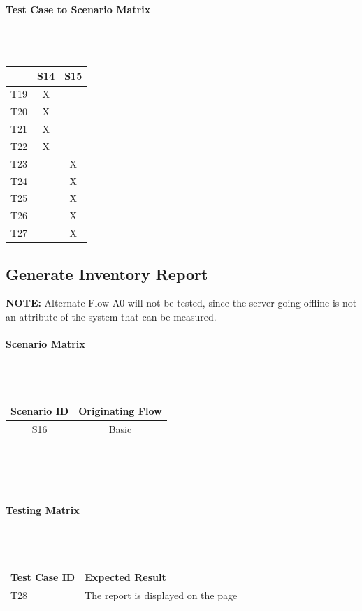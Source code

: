 \documentclass{article}
\begin{document}
\paragraph{Test Case to Scenario Matrix}~\\ \\
\begin{tabular}{ | c || c | c | }
\hline
    & S14 & S15 \\
\hline
\hline
T19 &  X  &     \\
\hline
T20 &  X  &     \\
\hline
T21 &  X  &     \\
\hline
T22 &  X  &     \\
\hline
T23 &     &  X  \\
\hline
T24 &     &  X  \\
\hline
T25 &     &  X  \\
\hline
T26 &     &  X  \\
\hline
T27 &     &  X  \\
\hline
\end{tabular}

\subsection{Generate Inventory Report}
\textbf{NOTE:} Alternate Flow A0 will not be tested, since the server going offline is not an attribute of the system that can be measured.

\paragraph{Scenario Matrix}~\\ \\
\begin{tabular}{ c  c }
\hline
Scenario ID & Originating Flow \\
\hline
\hline
S16 & Basic \\
\hline
\end{tabular}\\
~\\
~\\
\paragraph{Testing Matrix}~\\ \\
\begin{tabular}{ p{0.8in}  p{2.2in} }
\hline
Test Case ID & Expected Result\\
\hline
\hline
T28 & The report is displayed on the page\\
\hline
\end{tabular}\\
~\\
~\\
\end{document}
